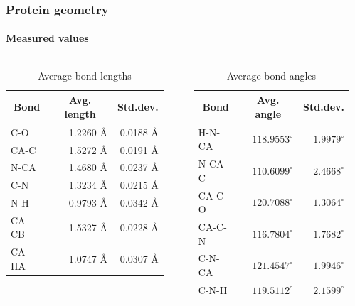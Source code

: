 \documentclass{beamer}
\begin{document}
\begin{frame}[t, fragile]
  \frametitle{Protein geometry}
  \framesubtitle{Measured values}

\vspace{-0.5cm}
  \begin{columns}
 \column{5.5cm}
  \centering
\begin{table}
  \caption{Average bond lengths}
\begin{small}
  \begin{tabular}{lrr}
    \toprule
    \multicolumn{1}{c}{Bond} & \multicolumn{1}{c}{Avg. length} & \multicolumn{1}{c}{Std.dev.} \\ \midrule 
    C-O   & 1.2260 Å & 0.0188 Å\\
    CA-C  & 1.5272 Å & 0.0191 Å\\
    N-CA  & 1.4680 Å & 0.0237 Å\\
    C-N   & 1.3234 Å & 0.0215 Å\\
    N-H   & 0.9793 Å & 0.0342 Å\\
    CA-CB & 1.5327 Å & 0.0228 Å\\
    CA-HA & 1.0747 Å & 0.0307 Å\\ \bottomrule
  \end{tabular}
\end{small}
  \vspace{1mm}
  \label{tab:average_bond_lengths}
\end{table}

\column{5.5cm}
\begin{table}
  \centering
  \caption{Average bond angles}
\begin{small}
  \begin{tabular}{lrr}
    \toprule
    \multicolumn{1}{c}{Bond} & \multicolumn{1}{c}{Avg. angle} & \multicolumn{1}{c}{Std.dev.} \\ \midrule 
    H-N-CA & $118.9553^\circ$ & $1.9979^\circ$\\
    N-CA-C & $110.6099^\circ$ & $2.4668^\circ$\\
    CA-C-O & $120.7088^\circ$ & $1.3064^\circ$\\
    CA-C-N & $116.7804^\circ$ & $1.7682^\circ$\\
    C-N-CA & $121.4547^\circ$ & $1.9946^\circ$\\
    C-N-H  & $119.5112^\circ$ & $2.1599^\circ$\\ \bottomrule
  \end{tabular}
\end{small}
  \vspace{1mm}
  \label{tab:average_bond_angles}
\end{table}

\end{columns}
\end{frame}
\end{document}
